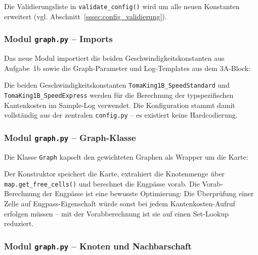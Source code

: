Die Validierungsliste in \texttt{validate\_config()} wird um alle neuen Konstanten erweitert (vgl. Abschnitt~\ref{sssec:config_validierung}).


\subsubsection{Modul \texttt{graph.py} – Imports}

Das neue Modul importiert die beiden Geschwindigkeitskonstanten aus Aufgabe~1b sowie die Graph-Parameter und Log-Templates aus dem 3A-Block:



Die beiden Geschwindigkeitskonstanten \texttt{TomaKing1B\_SpeedStandard} und \\ \texttt{TomaKing1B\_SpeedExpress} werden für die Berechnung der typspezifischen Kantenkosten im Sample-Log verwendet. Die Konfiguration stammt damit vollständig aus der zentralen \texttt{config.py} -- es existiert keine Hardcodierung.


\subsubsection{Modul \texttt{graph.py} – Graph-Klasse}

Die Klasse \texttt{Graph} kapselt den gewichteten Graphen als Wrapper um die Karte:



Der Konstruktor speichert die Karte, extrahiert die Knotenmenge über \texttt{map.get\_free\_cells()} und berechnet die Engpässe vorab. Die Vorab-Berechnung der Engpässe ist eine bewusste Optimierung: Die Überprüfung einer Zelle auf Engpass-Eigenschaft würde sonst bei jedem Kantenkosten-Aufruf erfolgen müssen -- mit der Vorabberechnung ist sie auf einen Set-Lookup reduziert.


\subsubsection{Modul \texttt{graph.py} – Knoten und Nachbarschaft}

